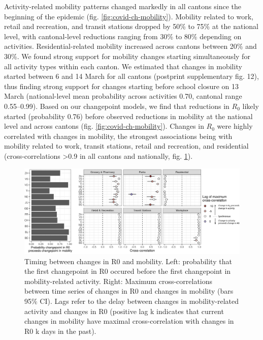 Activity-related mobility patterns changed markedly in all cantons since the beginning of the epidemic (fig. \ref{fig:covid-ch-mobility}). Mobility related to work, retail and recreation, and transit stations dropped by 50\% to 75\% at the national level, with cantonal-level reductions ranging from 30\% to 80\% depending on activities. Residential-related mobility increased across cantons between 20\% and 30\%. We found strong support for mobility changes starting simultaneously for all activity types within each canton. We estimated that changes in mobility started between 6 and 14 March for all cantons (postprint supplementary fig. 12), thus finding strong support for changes starting before school closure on 13 March (national-level mean probability across activities 0.70, cantonal range 0.55–0.99). Based on our changepoint models, we find that reductions in $R_0$ likely started (probability 0.76) before observed reductions in mobility at the national level and across cantons (fig. \ref{fig:covid-ch-mobility}). Changes in $R_0$ were highly correlated with changes in mobility, the strongest associations being with mobility related to work, transit stations, retail and recreation, and residential (cross-correlations >0.9 in all cantons and nationally, fig. \ref{fig:covid-ch-timing}). 
\begin{figure}\centering
  \includegraphics[width=\textwidth]{fig_covid-switzerland-npi/FIGURE_4.png}
  \caption[Timing between changes in R0 and mobility.]{Timing between changes in R0 and mobility. Left: probability that the first changepoint in R0 occured before the first changepoint in mobility-related activity. Right: Maximum cross-correlations between time series of changes in R0 and changes in mobility (bars 95\% CI). Lags refer to the delay between changes in mobility-related activity and changes in R0 (positive lag k indicates that current changes in mobility have maximal cross-correlation with changes in R0 k days in the past).}
  \label{fig:covid-ch-timing}
\end{figure}

